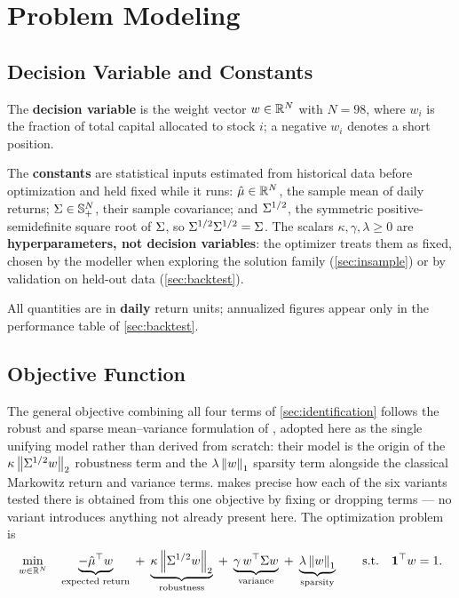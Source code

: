 \section{Problem Modeling}\label{sec:modeling}

\subsection{Decision Variable and Constants}

The \textbf{decision variable} is the weight vector $w \in \mathbb{R}^{N}$ with $N = 98$, where $w_i$
is the fraction of total capital allocated to stock $i$; a negative $w_i$ denotes a short
position.

The \textbf{constants} are statistical inputs estimated from historical data before optimization
and held fixed while it runs: $\hat{\mu} \in \mathbb{R}^{N}$, the sample mean of daily returns;
$\Sigma \in \mathbb{S}^{N}_{+}$, their sample covariance; and $\Sigma^{1/2}$, the symmetric
positive-semidefinite square root of $\Sigma$, so $\Sigma^{1/2}\Sigma^{1/2} = \Sigma$. The scalars
$\kappa, \gamma, \lambda \ge 0$ are \textbf{hyperparameters, not decision variables}: the
optimizer treats them as fixed, chosen by the modeller when exploring the solution family
(\cref{sec:insample}) or by validation on held-out data (\cref{sec:backtest}).

All quantities are in \textbf{daily} return units; annualized figures appear only in the
performance table of \cref{sec:backtest}.

\subsection{Objective Function}

The general objective combining all four terms of \cref{sec:identification} follows the robust
and sparse mean--variance formulation of \citet{chen2024}, adopted here as the single unifying
model rather than derived from scratch: their model is the origin of the $\kappa\left\lVert \Sigma^{1/2} w \right\rVert_2$
robustness term and the $\lambda\left\lVert w \right\rVert_1$ sparsity term alongside the classical Markowitz return
and variance terms.  makes precise how each of the six variants tested there is
obtained from this one objective by fixing or dropping terms --- no variant introduces anything
not already present here. The optimization problem is
\begin{equation}\label{eq:main}
\min_{w \in \mathbb{R}^{N}} \quad
  \underbrace{-\hat{\mu}^\top w}_{\text{expected return}}
  \;+\; \underbrace{\kappa \left\lVert \Sigma^{1/2} w \right\rVert_2}_{\text{robustness}}
  \;+\; \underbrace{\gamma\, w^\top \Sigma w}_{\text{variance}}
  \;+\; \underbrace{\lambda \left\lVert w \right\rVert_1}_{\text{sparsity}}
\qquad \text{s.t.} \quad \mathbf{1}^\top w = 1 .
\end{equation}

